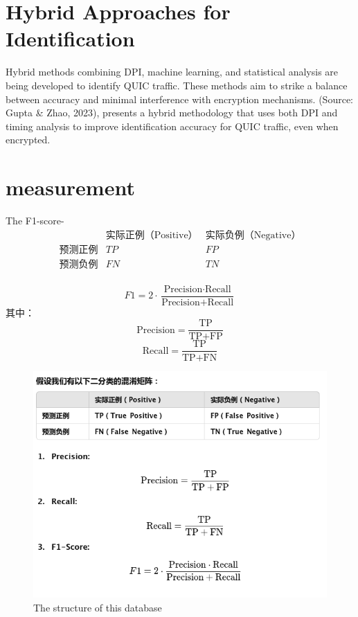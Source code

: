 \documentclass[a4paper, 10pt]{article}
\begin{document}
\section{Hybrid Approaches for Identification}
Hybrid methods combining DPI, machine learning, and statistical analysis are being developed to identify QUIC traffic. These methods aim to strike a balance between accuracy and minimal interference with encryption mechanisms.
(Source: Gupta \& Zhao, 2023), presents a hybrid methodology that uses both DPI and timing analysis to improve identification accuracy for QUIC traffic, even when encrypted.

\section{measurement}
The F1-score-
\[
	\begin{array}{c|c|c}
		\text{}     & \text{实际正例（Positive）} & \text{实际负例（Negative）} \\
		\hline
		\text{预测正例} & TP                    & FP                    \\
		\text{预测负例} & FN                    & TN                    \\
	\end{array}
\]



\[
	F1 = 2 \cdot \frac{\text{Precision} \cdot \text{Recall}}{\text{Precision} + \text{Recall}}
\]
其中：
\[
	\text{Precision} = \frac{\text{TP}}{\text{TP} + \text{FP}}
\]
\[
	\text{Recall} = \frac{\text{TP}}{\text{TP} + \text{FN}}
\]

\begin{figure}[ht]
	\centering
	\begin{minipage}{0.8\textwidth}%
		\includegraphics[width=15cm]{F1.jpg}
		\caption{The structure of this database}
		\label{fig:F1score}
	\end{minipage}
\end{figure}
\end{document}
